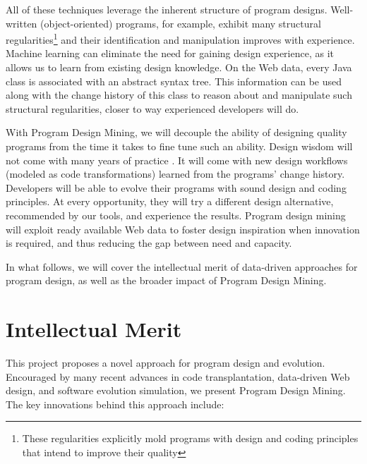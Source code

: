 All of these techniques leverage the inherent structure of program designs. 
Well-written (object-oriented) programs, for example, exhibit many structural 
regularities\footnote{These regularities explicitly mold programs with design 
and coding principles that intend to improve their quality} and their 
identification and manipulation improves with experience. Machine learning 
can eliminate the need for gaining design experience, as it allows us to learn 
from existing design knowledge. On the Web data, every Java class is associated 
with an abstract syntax tree. This information can be used along with the change 
history of this class to reason about and manipulate such structural regularities, 
closer to way experienced developers will do. 

With Program Design Mining, we will decouple the ability of designing quality 
programs from the time it takes to fine tune such an ability. Design wisdom 
will not come with many years of practice \cite{weiser1983programming, 
winslow1996programming}. It will come with new design workflows (modeled as code 
transformations) learned from the programs' change history. Developers will be able 
to evolve their programs with sound design and coding principles. At every 
opportunity, they will try a different design alternative, recommended by 
our tools, and experience the results. Program design mining will exploit ready 
available Web data to foster design inspiration when innovation is required, 
and thus reducing the gap between need and capacity.

In what follows, we will cover the intellectual merit of data-driven 
approaches for program design, as well as the broader impact of Program 
Design Mining.

\section*{Intellectual Merit} %
\label{sec:merit}

This project proposes a novel approach for program design and 
evolution. Encouraged by many recent advances in code transplantation, 
data-driven Web design, and software evolution simulation, we 
present Program Design Mining. The key innovations behind this 
approach include:

